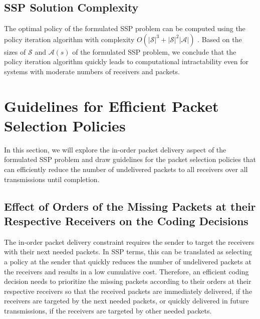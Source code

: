 \documentclass[12pt, peerreview, onecolumn]{IEEEtran}
\begin{document}
\subsection{SSP Solution Complexity} \label{complexity}
The optimal policy of the formulated SSP problem can be computed using the policy iteration algorithm with  complexity $O(|\mathcal{S}|^3 + |\mathcal{S}|^2|\mathcal{A}|)$  \cite{puterman2009markov}.  Based on the sizes of  $\mathcal{S}$  and  $\mathcal{A}(s)$  of the formulated  SSP problem,  we conclude that the policy iteration algorithm quickly leads to computational intractability even for systems with moderate numbers of  receivers  and packets.

\vspace{-5mm}
\section{Guidelines for  Efficient Packet Selection Policies}\label{guidelines}
In this section,  we will  explore  the  in-order packet delivery aspect of the formulated  SSP problem and  draw  guidelines for the packet selection policies that can efficiently reduce the number of undelivered packets to all receivers over all transmissions until completion.
\vspace{-5mm}
\subsection{Effect of  Orders of the Missing  Packets at their Respective Receivers on the Coding Decisions} \label{sec:packet}

The in-order packet delivery  constraint requires the sender to target the receivers with their next needed  packets. In SSP terms,  this can be translated  as selecting a policy at the sender  that quickly reduces    the number  of undelivered packets  at the receivers  and results in a low cumulative  cost. Therefore, an efficient coding decision needs to prioritize the missing packets according to  their orders at their respective receivers so that the received packets are immediately  delivered, if the receivers are  targeted by the next needed packets, or   quickly delivered in future transmissions, if the receivers are targeted by other needed packets.
\end{document}
